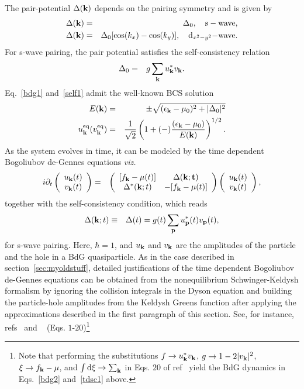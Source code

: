 \documentclass[aps,pra,floats,epsfig,pdflatex]{revtex4}                                                              %
\begin{document}
The pair-potential $\Delta({\bf k})$ depends on the pairing symmetry and is given by
\begin{eqnarray}
\Delta({\bf k}) &=& \Delta_0, \quad {\rm s-wave }, \nonumber\\
\Delta({\bf k}) &=& \Delta_0 [\cos(k_x) -\cos(k_y)],  \quad {\rm
d}_{x^2-y^2}{\rm -wave}. \label{pp}
\end{eqnarray}
For s-wave pairing, the pair potential satisfies the self-consistency relation
\begin{eqnarray}
\Delta_0 &=& g \sum_{\bf k} u_{\bf k}^{\ast} v_{\bf k}.
\label{self1}
\end{eqnarray}
Eq.~\ref{bdg1} and~\ref{self1} admit the well-known BCS solution
\begin{eqnarray}
E({\bf k})&=& \pm \sqrt{(\epsilon_{{\bf k}}-\mu_0)^2+|\Delta_0|^2}
\nonumber\\
u^{\rm eq}_{\bf k} (v^{\rm eq}_{\bf k}) &=& \frac{1}{{\sqrt 2}}
\left( 1+(-) \frac{(\epsilon_{\bf k} -\mu_0)}{E({\bf k})}
\right)^{1/2}. \label{eqsol}
\end{eqnarray}
As the system evolves in time, it can be modeled by the time dependent Bogoliubov de-Gennes equations \textit{viz.}
\begin{eqnarray}
i \partial_t \left(\begin{array}{c} u_{\bf k}(t) \\ v_{\bf
k}(t)
\end{array} \right) &=& \left(
\begin{array}{cc}
[f_{\bf k}-\mu (t)] & \Delta({\bf k;t})\\
\Delta^{\ast}({\bf k};t) & -[f_{\bf k}-\mu(t)]
\end{array} \right) \left(\begin{array}{c} u_{\bf k}(t)\\ v_{\bf
k}(t)
\end{array} \right), \label{bdg2} \nonumber\\
\end{eqnarray}
together with the self-consistency condition, which reads
\begin{eqnarray}
\Delta({\bf k};t) &\equiv& \Delta(t) = g(t) \sum_{\bf p} u^{\ast}_{\bf
p}(t) v_{\bf p}(t),\label{tdsc1}
\end{eqnarray}
for s-wave pairing. Here, $\hbar=1$, and $u_{\bf k}$ and $v_{\bf k}$ are the amplitudes of the particle
and the hole in a BdG quasiparticle.  { As in the case described in section~\ref{sec:myoldstuff}, detailed justifications of the time dependent Bogoliubov de-Gennes equations can be obtained from the nonequilibrium Schwinger-Keldysh formalism by ignoring the collision integrals in the Dyson equation and building the particle-hole amplitudes from the Keldysh Greens function after applying the approximations described in the first paragraph of this section. See, for instance, refs}~\cite{gorkov} and ~\cite{volkov} (Eqs. $1$-$20$)\footnote{Note that performing the substitutions $f\rightarrow u^\ast_{\bf k} v_{\bf k}$, $g\rightarrow 1-2|v_{\bf k}|^2$, $\xi\rightarrow f_{\bf k}-\mu$, and $\int \mathrm{d}\xi\rightarrow\sum_{\bf k}$ in Eqs. $20$ of ref~\cite{volkov} yield the BdG dynamics in Eqs.~\ref{bdg2} and~\ref{tdsc1} above.}
\end{document}
